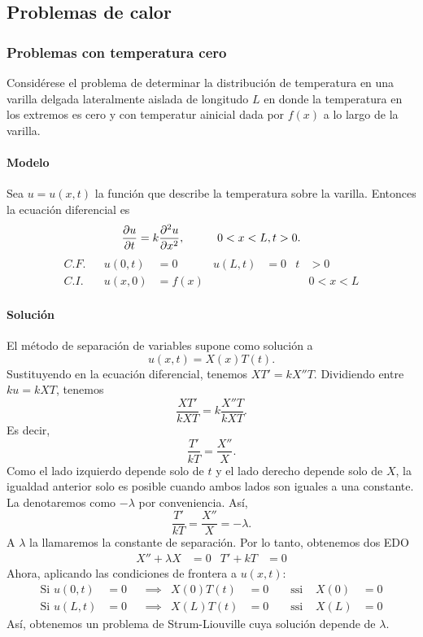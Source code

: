 \documentclass[11pt,letterpaper]{report}
\newcommand\<{\langle}
\renewcommand\>{\rangle}
\begin{document}
\subsection{Problemas de calor}

\subsubsection{Problemas con temperatura cero}
Considérese el problema de determinar la distribución de
temperatura en una varilla delgada lateralmente aislada de
longitudo $L$ en donde la temperatura en los extremos es cero y
con temperatur ainicial dada por $f(x)$ a lo largo de la varilla.

\paragraph{Modelo}
Sea $u=u(x,t)$ la función que describe la temperatura sobre la
varilla. Entonces la ecuación diferencial es
\[
  \frac{\partial u}{\partial t}
  = k
  \frac{\partial^2 u}{\partial x^2},
  \hspace{10mm} 0<x<L, t>0
.\]
\begin{align*}
  C.F. && u(0,t) &= 0 & u(L,t) &= 0 &t&>0 \\
  C.I. && u(x,0) &= f(x) & &&& 0<x<L
\end{align*}

\paragraph{Solución}
El método de separación de variables supone como solución a
\[
  u(x,t) = X(x)T(t)
.\]
Sustituyendo en la ecuación diferencial, tenemos $XT'=kX''T$.
Dividiendo entre $ku=kXT$, tenemos
\[
  \frac{XT'}{kXT} = k \frac{X''T}{kXT}
.\]
Es decir,
\[
  \frac{T'}{kT} = \frac{X''}{X}
.\]
Como el lado izquierdo depende solo de $t$ y el lado derecho
depende solo de $X$, la igualdad anterior solo es posible cuando
ambos lados son iguales a una constante. La denotaremos como
$-\lambda$ por conveniencia.
Así,
\[
  \frac{T'}{kT} = \frac{X''}{X} = -\lambda
.\]
A $\lambda$ la llamaremos la constante de separación.
Por lo tanto, obtenemos dos EDO
\begin{align*}
  X'' + \lambda X &= 0
  &
  T' + kT &= 0
\end{align*}
Ahora, aplicando las condiciones de frontera a $u(x,t)$:
\begin{align*}
  \text{Si } u(0,t)&=0
  & &\implies &
  X(0)T(t)&=0
  & &\text{ ssi } &
  X(0)&=0 \\
  \text{Si } u(L,t)&=0
  & &\implies &
  X(L)T(t)&=0
  & &\text{ ssi } &
  X(L)&=0
\end{align*}
Así, obtenemos un problema de Strum-Liouville cuya solución
depende de $\lambda$.
\end{document}
